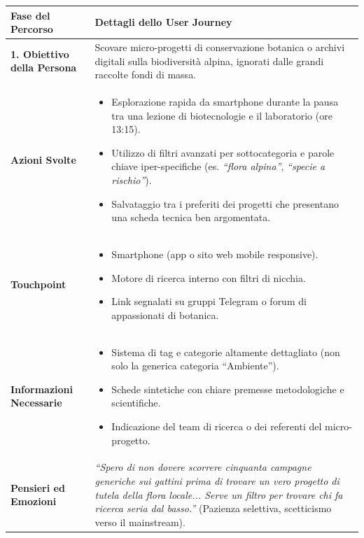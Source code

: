 \documentclass[11pt,a4paper]{article}
\begin{document}
\begin{table}[h!]
\centering
\small
\begin{tabular}{|p{3.2cm}|p{11.8cm}|}
\hline
\textbf{Fase del Percorso} & \textbf{Dettagli dello User Journey} \\ \hline
\hline
\textbf{1. Obiettivo della Persona} & Scovare micro-progetti di conservazione botanica o archivi digitali sulla biodiversità alpina, ignorati dalle grandi raccolte fondi di massa. \\ \hline
\textbf{Azioni Svolte} &
\begin{itemize}[leftmargin=*,nosep]
    \item Esplorazione rapida da smartphone durante la pausa tra una lezione di biotecnologie e il laboratorio (ore 13:15).
    \item Utilizzo di filtri avanzati per sottocategoria e parole chiave iper-specifiche (es. \textit{``flora alpina''}, \textit{``specie a rischio''}).
    \item Salvataggio tra i preferiti dei progetti che presentano una scheda tecnica ben argomentata.
\end{itemize} \\ \hline
\textbf{Touchpoint} &
\begin{itemize}[leftmargin=*,nosep]
    \item Smartphone (app o sito web mobile responsive).
    \item Motore di ricerca interno con filtri di nicchia.
    \item Link segnalati su gruppi Telegram o forum di appassionati di botanica.
\end{itemize} \\ \hline
\textbf{Informazioni Necessarie} &
\begin{itemize}[leftmargin=*,nosep]
    \item Sistema di tag e categorie altamente dettagliato (non solo la generica categoria ``Ambiente'').
    \item Schede sintetiche con chiare premesse metodologiche e scientifiche.
    \item Indicazione del team di ricerca o dei referenti del micro-progetto.
\end{itemize} \\ \hline
\textbf{Pensieri ed Emozioni} &
\textit{``Spero di non dovere scorrere cinquanta campagne generiche sui gattini prima di trovare un vero progetto di tutela della flora locale... Serve un filtro per trovare chi fa ricerca seria dal basso.''} (Pazienza selettiva, scetticismo verso il mainstream). \\ \hline

\end{tabular}
\end{table}
\end{document}
